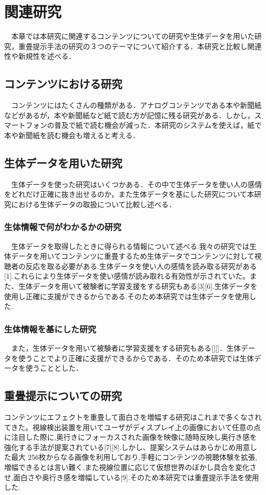 \thispagestyle{myheadings}
\chapter{関連研究}
　本章では本研究に関連するコンテンツについての研究や生体データを用いた研究，重畳提示手法の研究の３つのテーマについて紹介する．本研究と比較し関連性や新規性を述べる．

\section{コンテンツにおける研究}
　コンテンツにはたくさんの種類がある．アナログコンテンツである本や新聞紙などがあるが，本や新聞紙など紙で読む方が記憶に残る研究がある．しかし，スマートフォンの普及で紙で読む機会が減った．本研究のシステムを使えば，紙で本や新聞紙を読む機会も増えると考える．
\section{生体データを用いた研究}
　生体データを使った研究はいくつかある．その中で生体データを使い人の感情をどれだけ正確に抜き出せるのか，また生体データを基にした研究について本研究における生体データの取扱について比較し述べる．
\subsection{生体情報で何がわかるかの研究}
　生体データを取得したときに得られる情報について述べる.我々の研究では生体データを用いてコンテンツに重畳するため生体データでコンテンツに対して視聴者の反応を取る必要がある.生体データを使い人の感情を読み取る研究がある[1].これらにより生体データを使い感情が読み取れる有効性が示されていた。また、生体データを用いて被験者に学習支援をする研究もある[3][6].生体データを使用し正確に支援ができるからである.そのため本研究では生体データを使用した.
\subsection{生体情報を基にした研究}
　また，生体データを用いて被験者に学習支援をする研究もある[][]．生体データを使うことでより正確に支援ができるからである．そのため本研究では生体データを使うこととした．

\section{重畳提示についての研究}
コンテンツにエフェクトを重畳して面白さを増幅する研究はこれまで多くなされてきた。視線検出装置を用いてユーザがディスプレイ上の画像において任意の点に注目した際に,奥行きにフォーカスされた画像を映像に随時反映し奥行き感を強化する手法が提案されている[7][8].しかし、提案システムはあらかじめ用意した最大 256枚からなる画像を利用しており,手軽にコンテンツの視聴体験を拡張,増幅できるとは言い難く,また視線位置に応じて仮想世界のぼかし具合を変化させ,面白さや奥行き感を増幅している[9].そのため本研究では重畳提示手法を使用した.

